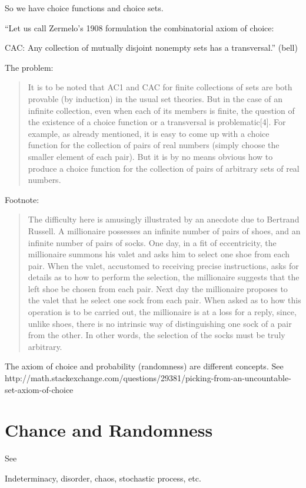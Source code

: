 \documentclass[reqno,12pt]{tufte-book}
\numberwithin{equation}{subsection}
\begin{document}
So we have choice functions and choice sets.


``Let us call Zermelo's 1908 formulation the combinatorial axiom of choice:

CAC: 
Any collection of mutually disjoint nonempty sets has a transversal.'' (bell)


The problem:


\blockquote{It is to be noted that AC1 and CAC for finite collections
  of sets are both provable (by induction) in the usual set
  theories. But in the case of an infinite collection, even when each
  of its members is finite, the question of the existence of a choice
  function or a transversal is problematic[4]. For example, as already
  mentioned, it is easy to come up with a choice function for the
  collection of pairs of real numbers (simply choose the smaller
  element of each pair). But it is by no means obvious how to produce
  a choice function for the collection of pairs of arbitrary sets of
  real numbers.\cite{bell_axiom_2013}}

Footnote: 
\blockquote{The difficulty here is amusingly illustrated by an anecdote due to Bertrand Russell. A millionaire possesses an infinite number of pairs of shoes, and an infinite number of pairs of socks. One day, in a fit of eccentricity, the millionaire summons his valet and asks him to select one shoe from each pair. When the valet, accustomed to receiving precise instructions, asks for details as to how to perform the selection, the millionaire suggests that the left shoe be chosen from each pair. Next day the millionaire proposes to the valet that he select one sock from each pair. When asked as to how this operation is to be carried out, the millionaire is at a loss for a reply, since, unlike shoes, there is no intrinsic way of distinguishing one sock of a pair from the other. In other words, the selection of the socks must be truly arbitrary.}

The axiom of choice and probability (randomness) are different
concepts.  See
http://math.stackexchange.com/questions/29381/picking-from-an-uncountable-set-axiom-of-choice

\section{Chance and Randomness}

See \cite{eagle_chance_2014}

Indeterminacy, disorder, chaos, stochastic process, etc.
\end{document}
